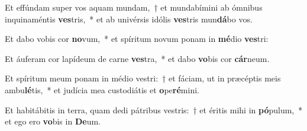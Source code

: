 \item Et effúndam super vos aquam mundam,~† et mundabímini ab ómnibus inquinaméntis \textbf{ves}tris,~* et ab univérsis idólis \textbf{ves}tris mun\textbf{dá}bo vos.
\item Et dabo vobis cor \textbf{no}vum,~* et spíritum novum ponam in \textbf{mé}dio \textbf{ves}tri:
\item Et áuferam cor lapídeum de carne \textbf{ves}tra,~* et dabo \textbf{vo}bis cor \textbf{cár}neum.
\item Et spíritum meum ponam in médio vestri:~† et fáciam, ut in præcéptis meis ambu\textbf{lé}tis,~* et judícia mea custodiátis et \textbf{o}pe\textbf{ré}mini.
\item Et habitábitis in terra, quam dedi pátribus vestris:~† et éritis mihi in \textbf{pó}pulum,~* et ego ero \textbf{vo}bis in \textbf{De}um.
